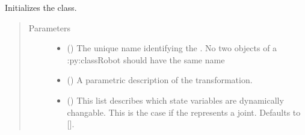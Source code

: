 \documentclass[letterpaper,10pt,english]{sphinxmanual}
\begin{document}

\begin{fulllineitems}
\label{\detokenize{code_docu:trip_kinematics.KinematicGroup.Transformation}}
Initializes the {\hyperref[\detokenize{code_docu:trip_kinematics.KinematicGroup.Transformation}]{}} class.
\begin{quote}\begin{description}
\item[{Parameters}] \leavevmode\begin{itemize}
\item {} 
 () \textendash{} The unique name identifying the . No two {\hyperref[\detokenize{code_docu:trip_kinematics.KinematicGroup.Transformation}]{}} objects of a :py:class\textasciigrave{}Robot\textasciigrave{} should have the same name

\item {} 
 (\sphinxstyleliteralemphasis{\sphinxupquote{{[}}}\sphinxstyleliteralemphasis{\sphinxupquote{, }}\sphinxstyleliteralemphasis{\sphinxupquote{{]}}}) \textendash{} A parametric description of the transformation.

\item {} 
 (\sphinxstyleliteralemphasis{\sphinxupquote{{[}}}\sphinxstyleliteralemphasis{\sphinxupquote{{]}}}\sphinxstyleliteralemphasis{\sphinxupquote{, }}) \textendash{} This list describes which state variables are dynamically changable.
This is the case if the {\hyperref[\detokenize{code_docu:trip_kinematics.KinematicGroup.Transformation}]{}} represents a joint. Defaults to {[}{]}.


\end{itemize}
\end{description}
\end{quote}
\end{fulllineitems}
\end{document}
